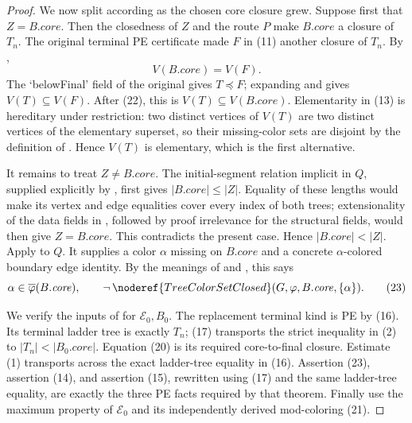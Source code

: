 \begin{proof}
We now split according as the chosen core closure grew.  Suppose first that
\(Z=B.\mathit{core}\).  Then the closedness of \(Z\) and the route \(P\)
make \(B.\mathit{core}\) a closure of \(T_n\).  The original terminal PE
certificate made \(F\) in (11) another closure of \(T_n\).  By
,
\[
                        V(B.\mathit{core})=V(F).                  \tag{22}
\]
The `belowFinal' field of the original
 gives \(T\preccurlyeq F\); expanding
 and
 gives \(V(T)\subseteq V(F)\).  After (22),
this is \(V(T)\subseteq V(B.\mathit{core})\).  Elementarity in (13) is
hereditary under restriction: two distinct vertices of \(V(T)\) are two
distinct vertices of the elementary superset, so their missing-color sets
are disjoint by the definition of .
Hence \(V(T)\) is elementary, which is the first alternative.

It remains to treat \(Z\ne B.\mathit{core}\).  The initial-segment relation
implicit in \(Q\), supplied explicitly by
, first gives
\(|B.\mathit{core}|\leq|Z|\).  Equality of these lengths would make its
vertex and edge equalities cover every index of both trees; extensionality of
the data fields in , followed by proof irrelevance for
the structural fields, would then give \(Z=B.\mathit{core}\).  This contradicts
the present case.  Hence
\(|B.\mathit{core}|<|Z|\).  Apply
 to \(Q\).
It supplies a color \(\alpha\) missing on \(B.\mathit{core}\) and a concrete
\(\alpha\)-colored boundary edge identity.  By the meanings of
 and , this says
\[
 \alpha\in\overline\varphi(B.\mathit{core}),\qquad
 \neg\,\noderef{TreeColorSetClosed}
       (G,\varphi,B.\mathit{core},\{\alpha\}).                    \tag{23}
\]

We verify the inputs of  for
\(\mathcal E_0,B_0\).  The replacement terminal kind is PE by (16).  Its
terminal ladder tree is exactly \(T_n\); (17) transports the strict
inequality in (2) to \(|T_n|<|B_0.\mathit{core}|\).  Equation (20) is its
required core-to-final closure.  Estimate (1) transports across the exact
ladder-tree equality in (16).  Assertion (23), assertion (14), and assertion
(15), rewritten using (17) and the same ladder-tree equality, are exactly the
three PE facts required by that theorem.  Finally use the maximum property of
\(\mathcal E_0\) and its independently derived mod-coloring (21).


\end{proof}

